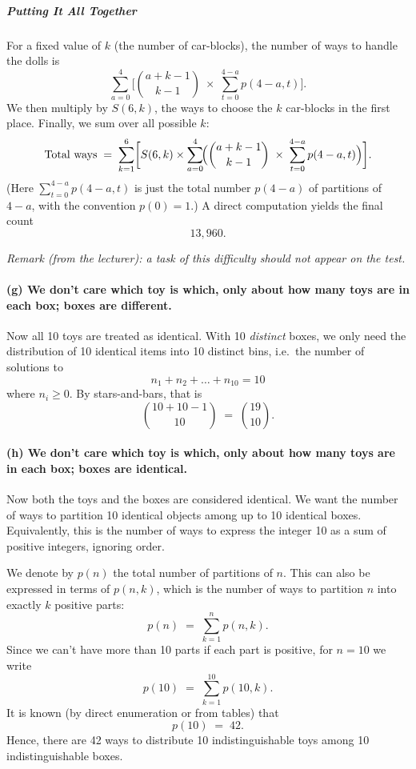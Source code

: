 \documentclass[docmute]{article}
\begin{document}
\subparagraph{Putting It All Together}

For a fixed value of \(k\) (the number of car-blocks), the number of ways to handle the dolls is
\[
\sum_{a=0}^{4}
\Biggl[
  \binom{a + k - 1}{k - 1}
  \;\times\;
  \sum_{t=0}^{4 - a} p(4 - a, t)
\Biggr].
\]
We then multiply by \(S(6,k)\), the ways to choose the \(k\) car-blocks in the first place.  
Finally, we sum over all possible \(k\):
\[
\text{Total ways}
\;=\;
\sum_{k=1}^{6}
\biggl[
  S(6,k)
  \times
  \sum_{a=0}^{4}\!\Bigl(
      \binom{a + k - 1}{k - 1}
      \;\times\;
      \sum_{t=0}^{4-a} p(4 - a, t)
  \Bigr)
\biggr].
\]
(Here \(\sum_{t=0}^{4-a} p(4-a,t)\) is just the total number \(p(4-a)\) of partitions of \(4-a\), with the convention \(p(0)=1\).)  A direct computation yields the final count
\[
\boxed{13{,}960}.
\]

\noindent\textit{Remark (from the lecturer): a task of this difficulty should not appear on the test.}

\paragraph{(g) We don’t care which toy is which, only about how many toys are in each box; boxes are different.}
Now all 10 toys are treated as identical. With 10 \emph{distinct} boxes, we only need the distribution of 10 identical items into 10 distinct bins, i.e.\ the number of solutions to
\[
n_1 + n_2 + \dots + n_{10} = 10
\]
where \(n_i \ge 0\). By stars-and-bars, that is
\[
\binom{10 + 10 - 1}{10} \;=\;\binom{19}{10}.
\]

\paragraph{(h) We don’t care which toy is which, only about how many toys are in each box; boxes are identical.}
Now both the toys and the boxes are considered identical. We want the number of ways to partition 10 identical objects among up to 10 identical boxes. Equivalently, this is the number of ways to express the integer 10 as a sum of positive integers, ignoring order. 

We denote by \(p(n)\) the total number of partitions of \(n\). This can also be expressed in terms of \(p(n,k)\), which is the number of ways to partition \(n\) into exactly \(k\) positive parts:
\[
p(n) \;=\; \sum_{k=1}^{n} p(n,k).
\]
Since we can’t have more than 10 parts if each part is positive, for \(n=10\) we write
\[
p(10) 
\;=\;
\sum_{k=1}^{10} p(10,k).
\]
It is known (by direct enumeration or from tables) that
\[
p(10) \;=\; 42.
\]
Hence, there are 42 ways to distribute 10 indistinguishable toys among 10 indistinguishable boxes.
\end{document}
